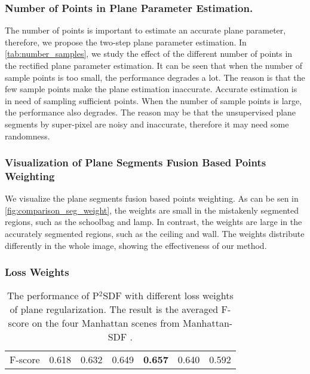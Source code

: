 \documentclass[10pt,journal,compsoc]{IEEEtran}
\begin{document}
\subsubsection{Number of Points in Plane Parameter Estimation.} The number of points is important to estimate an accurate plane parameter, therefore, we propose the two-step plane parameter estimation. In \cref{tab:number_samples}, we study the effect of the different number of points in the rectified plane parameter estimation. It can be seen that when the number of sample points is too small, the performance degrades a lot. The reason is that the few sample points make the plane estimation inaccurate. Accurate estimation is in need of sampling sufficient points. When the number of sample points is large, the performance also degrades. The reason may be that the unsupervised plane segments by super-pixel are noisy and inaccurate, therefore it may need some randomness.

\subsubsection{Visualization of Plane Segments Fusion Based Points Weighting}
We visualize the plane segments fusion based points weighting. As can be sen in \cref{fig:comparison_seg_weight}, the weights are small in the mistakenly segmented regions, such as the schoolbag and lamp. In contrast, the weights are large in the accurately segmented regions, such as the ceiling and wall. The weights distribute differently in the whole image, showing the effectiveness of our method.

\subsubsection{Loss Weights} 
\begin{table}[htbp]
	\centering
	\caption{The performance of P$^2$SDF with different loss weights of plane regularization. The result is the averaged F-score on the four Manhattan scenes from Manhattan-SDF \cite{guo2022neural}.}
	\begin{tabular}{c|cccccc}
		\toprule
		\makebox[0.2\linewidth][c]{weight} & \makebox[0.02\linewidth][c]{0.01} & \makebox[0.02\linewidth][c]{0.05} & \makebox[0.02\linewidth][c]{0.1} & \makebox[0.02\linewidth][c]{0.2} & \makebox[0.02\linewidth][c]{0.5} & \makebox[0.02\linewidth][c]{1.0} \\
		\midrule
		F-score            & 0.618 & 0.632 & 0.649 & \textbf{0.657} & 0.640 & 0.592 \\
		\bottomrule
	\end{tabular}
	\label{tab:different_sdf}
\end{table}
\end{document}
